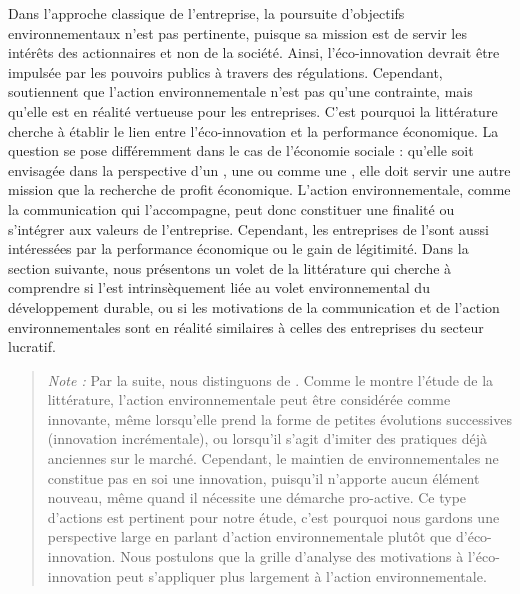 \transition
    Dans l'approche classique de l'entreprise, la poursuite d'objectifs environnementaux n'est pas pertinente, puisque sa mission est de servir les intérêts des actionnaires et non de la société. Ainsi, l'éco-innovation devrait être impulsée par les pouvoirs publics à travers des régulations. Cependant, \textcite{porter1995toward} soutiennent que l'action environnementale n'est pas qu'une contrainte, mais qu'elle est en réalité vertueuse pour les entreprises. C'est pourquoi la littérature cherche à établir le lien entre l'éco-innovation et la performance économique. La question se pose différemment dans le cas de l'économie sociale : qu'elle soit envisagée dans la perspective d'un  \parencite{yunus2010building}, une  \parencite{waridel2016economie} ou comme une , elle doit servir une autre mission que la recherche de profit économique. L'action environnementale, comme la communication qui l'accompagne, peut donc constituer une finalité ou s'intégrer aux valeurs de l'entreprise. Cependant, les entreprises de l'\ess sont aussi intéressées par la performance économique ou le gain de légitimité. Dans la section suivante, nous présentons un volet de la littérature qui cherche à comprendre si l'\ess est intrinsèquement liée au volet environnemental du développement durable, ou si les motivations de la communication et de l'action environnementales sont en réalité similaires à celles des entreprises du secteur lucratif. \\

    \begin{quotation}
        \small
        \textit{Note :} Par la suite, nous distinguons  de . Comme le montre l'étude de la littérature, l'action environnementale peut être considérée comme innovante, même lorsqu'elle prend la forme de petites évolutions successives (innovation incrémentale), ou lorsqu'il s'agit d'imiter des pratiques déjà anciennes sur le marché. Cependant, le maintien de  environnementales ne constitue pas en soi une innovation, puisqu'il n'apporte aucun élément nouveau, même quand il nécessite une démarche pro-active. Ce type d'actions est pertinent pour notre étude, c'est pourquoi nous gardons une perspective large en parlant d'action environnementale plutôt que d'éco-innovation. Nous postulons  que la grille d'analyse des motivations à l'éco-innovation peut s'appliquer plus largement à l'action environnementale.
    \end{quotation}


